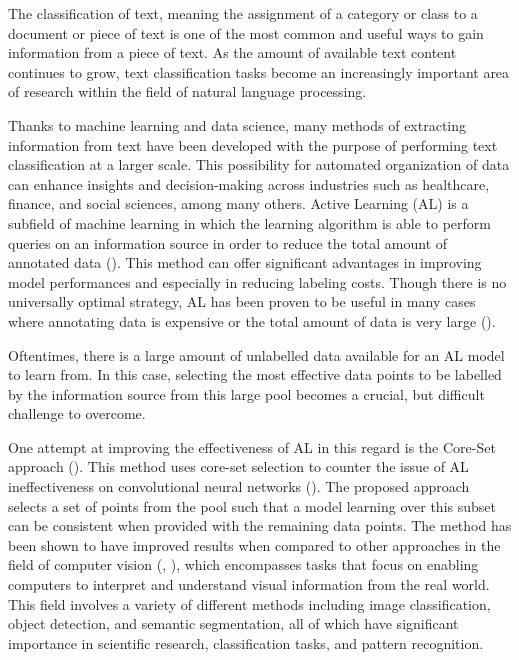 \documentclass[english,bachelor,ul]{webisthesis} %
\begin{document}
The classification of text, meaning the assignment of a category or class to a document or piece of text is one of the most common and useful ways to gain information from a piece of text. As the amount of available text content continues to grow, text classification tasks become an increasingly important area of research within the field of natural language processing. 

Thanks to machine learning and data science, many methods of extracting information from text have been developed with the purpose of performing text classification at a larger scale. This possibility for automated organization of data can enhance insights and decision-making across industries such as healthcare, finance, and social sciences, among many others. Active Learning (AL) is a subfield of machine learning in which the learning algorithm is able to perform queries on an information source in order to reduce the total amount of annotated data (\cite{settles.tr09}). This method can offer significant advantages in improving model performances and especially in reducing labeling costs. Though there is no universally optimal strategy, AL has been proven to be useful in many cases where annotating data is expensive or the total amount of data is very large (\cite{settles.tr09}). 

Oftentimes, there is a large amount of unlabelled data available for an AL model to learn from. In this case, selecting the most effective data points to be labelled by the information source from this large pool becomes a crucial, but difficult challenge to overcome. 

One attempt at improving the effectiveness of AL in this regard is the Core-Set approach (\cite{DBLP:conf/iclr/SenerS18}). This method uses core-set selection to counter the issue of AL ineffectiveness on convolutional neural networks (\cite{DBLP:conf/iclr/SenerS18}). The proposed approach selects a set of points from the pool such that a model learning over this subset can be consistent when provided with the remaining data points. The method has been shown to have improved results when compared to other approaches in the field of computer vision (\cite{DBLP:conf/iclr/SenerS18}, \cite{DBLP:conf/cvpr/CaramalauBK21}), which encompasses tasks that focus on enabling computers to interpret and understand visual information from the real world. This field involves a variety of different methods including image classification, object detection, and semantic segmentation, all of which have significant importance in scientific research, classification tasks, and pattern recognition.
\end{document}
